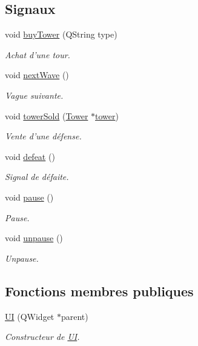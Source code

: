 \subsection*{Signaux}
\begin{DoxyCompactItemize}
\item 
void \hyperlink{classUI_aff34760681ad834d325122691afc8454}{buyTower} (QString type)
\begin{DoxyCompactList}\small\item\em Achat d'une tour. \end{DoxyCompactList}\item 
void \hyperlink{classUI_a63ad3c5f5b04203406c224ed01f50ddb}{nextWave} ()
\begin{DoxyCompactList}\small\item\em Vague suivante. \end{DoxyCompactList}\item 
void \hyperlink{classUI_a9c3ac46b4d04af5455a74f1034b44f26}{towerSold} (\hyperlink{classTower}{Tower} $\ast$\hyperlink{classUI_a352f80a494c8d3c1723f1248438ea912}{tower})
\begin{DoxyCompactList}\small\item\em Vente d'une défense. \end{DoxyCompactList}\item 
void \hyperlink{classUI_a6d4de01a54d50dfeb43e2b9d9af81dda}{defeat} ()
\begin{DoxyCompactList}\small\item\em Signal de défaite. \end{DoxyCompactList}\item 
void \hyperlink{classUI_ad8894e9a606c3c18c98fa80865f6c536}{pause} ()
\begin{DoxyCompactList}\small\item\em Pause. \end{DoxyCompactList}\item 
void \hyperlink{classUI_ab0e81d329c53e2fc8e3a37842665c35c}{unpause} ()
\begin{DoxyCompactList}\small\item\em Unpause. \end{DoxyCompactList}\end{DoxyCompactItemize}
\subsection*{Fonctions membres publiques}
\begin{DoxyCompactItemize}
\item 
\hyperlink{classUI_a983ff4bdfc1543f6ea015c21526d70b6}{UI} (QWidget $\ast$parent)
\begin{DoxyCompactList}\small\item\em Constructeur de \hyperlink{classUI}{UI}. \end{DoxyCompactList}\end{DoxyCompactItemize}
